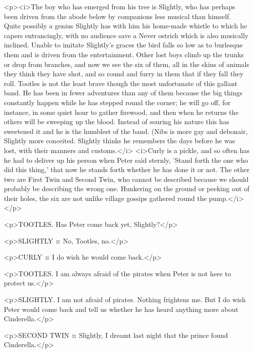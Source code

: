 <p><i>The boy who has emerged from his tree is Slightly, who has perhaps been driven from the abode below by companions less musical than himself. Quite possibly a genius Slightly has with him his home-made whistle to which he capers entrancingly, with no audience save a Never ostrich which is also musically inclined. Unable to imitate Slightly's graces the bird falls so low as to burlesque them and is driven from the entertainment. Other lost boys climb up the trunks or drop from branches, and now we see the six of them, all in the skins of animals they think they have shot, and so round and furry in them that if they fall they roll. Tootles is not the least brave though the most unfortunate of this gallant band. He has been in fewer adventures than any of them because the big things constantly happen while he has stepped round the corner; he will go off, for instance, in some quiet hour to gather firewood, and then when he returns the others will be sweeping up the blood. Instead of souring his nature this has sweetened it and he is the humblest of the band. (Nibs is more gay and debonair, Slightly more conceited. Slightly thinks he remembers the days before he was lost, with their manners and customs.</i> <i>Curly is a pickle, and so often has he had to deliver up his person when Peter said sternly, 'Stand forth the one who did this thing,' that now he stands forth whether he has done it or not. The other two are First Twin and Second Twin, who cannot be described because we should probably be describing the wrong one. Hunkering on the ground or peeking out of their holes, the six are not unlike village gossips gathered round the pump.</i></p>

<p>TOOTLES. Has Peter come back yet, Slightly?</p>

<p>SLIGHTLY ¤
No, Tootles, no.</p>


<p>CURLY ¤
I do wish he would come back.</p>

<p>TOOTLES. I am always afraid of the pirates when Peter is not here to protect us.</p>

<p>SLIGHTLY. I am not afraid of pirates. Nothing frightens me. But I do wish Peter would come back and tell us whether he has heard anything more about Cinderella.</p>

<p>SECOND TWIN ¤
Slightly, I dreamt last night that the prince found Cinderella.</p>

